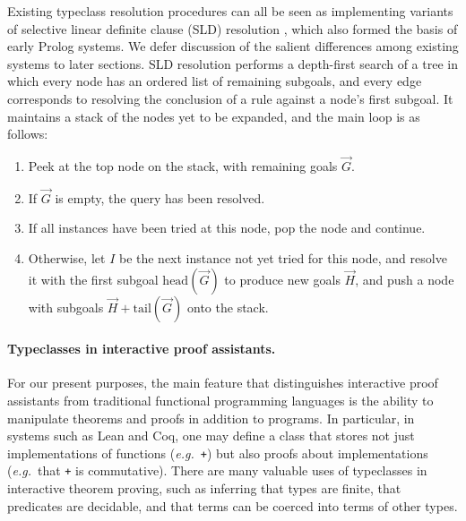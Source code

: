\documentclass[runningheads]{llncs}
\newcommand\eg{\emph{e.g.}\ }
\newcommand{\icode}[1]{\texttt{\small #1}}
\begin{document}
Existing typeclass resolution procedures can all be seen as implementing variants of
selective linear definite clause (SLD) resolution \cite{kowalski1974predicate},
which also formed the basis of early Prolog systems.
We defer discussion of the salient differences among existing systems to later sections.
SLD resolution performs a depth-first search of a tree in which every node has an ordered list of remaining subgoals,
and every edge corresponds to resolving the conclusion of a rule against a node's first subgoal.
It maintains a stack of the nodes yet to be expanded, and the main loop is as follows:
\begin{enumerate}
\item Peek at the top node on the stack, with remaining goals \( \overrightarrow{G} \).
\item If \( \overrightarrow{G} \) is empty, the query has been resolved.
\item If all instances have been tried at this node, pop the node and continue.
\item Otherwise, let \( I \) be the next instance not yet tried for this node, and resolve it with the first subgoal \( \mathrm{head}(\overrightarrow{G}) \) to produce new goals \( \overrightarrow{H} \),
  and push a node with subgoals \( \overrightarrow{H} + \mathrm{tail}(\overrightarrow{G}) \) onto the stack.
\end{enumerate}

\paragraph{Typeclasses in interactive proof assistants.}

For our present purposes, the main feature that distinguishes interactive proof assistants from traditional functional programming languages is the ability
to manipulate theorems and proofs in addition to programs.
In particular, in systems such as Lean and Coq, one may define a class that stores not just implementations of functions (\eg \icode{+})
but also proofs about implementations (\eg that \icode{+} is commutative).
There are many valuable uses of typeclasses in interactive theorem proving, such as inferring that types are finite, that predicates are decidable,
and that terms can be coerced into terms of other types.
\end{document}
